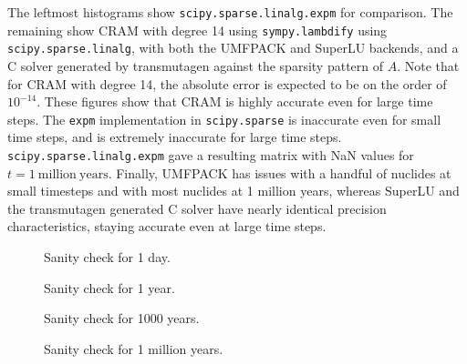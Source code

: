 The leftmost histograms show
\texttt{scipy.\allowbreak{}sparse.\allowbreak{}linalg.\allowbreak{}expm} for
comparison. The remaining show CRAM with degree 14 using
\texttt{sympy.\allowbreak{}lambdify} using
\texttt{scipy.\allowbreak{}sparse.\allowbreak{}linalg}, with both the UMFPACK
and SuperLU backends, and a C solver generated by transmutagen against the
sparsity pattern of $A$. Note that for CRAM with degree 14, the absolute error
is expected to be on the order of $10^{-14}$. These figures show that CRAM is
highly accurate even for large time steps. The \texttt{expm} implementation in
\texttt{scipy.\allowbreak{}sparse} is inaccurate even for small time steps,
and is extremely inaccurate for large time steps.
\texttt{scipy.\allowbreak{}sparse.\allowbreak{}linalg.\allowbreak{}expm} gave
a resulting matrix with NaN values for $t = 1 \mathrm{\ million\ years}$.
Finally, UMFPACK has issues with a handful of nuclides at small timesteps and
with most nuclides at 1 million years, whereas SuperLU and the transmutagen
generated C solver have nearly identical precision characteristics, staying
accurate even at large time steps.

\begin{figure}[!ht]
\centering
\resizebox{0.9\textwidth}{!}{}
\caption{Sanity check for 1 day.}
\label{fig:nofission-pwru50-1-day}
\end{figure}

\begin{figure}[!ht]
\centering
\resizebox{0.9\textwidth}{!}{}
\caption{Sanity check for 1 year.}
\label{fig:nofission-pwru50-1-year}
\end{figure}

\begin{figure}[!ht]
\centering
\resizebox{0.9\textwidth}{!}{}
\caption{Sanity check for 1000 years.}
\label{fig:nofission-pwru50-1000-years}
\end{figure}

\begin{figure}[!ht]
\centering
\resizebox{0.9\textwidth}{!}{}
\caption{Sanity check for 1 million years.}
\label{fig:nofission-pwru50-1-million-years}
\end{figure}
